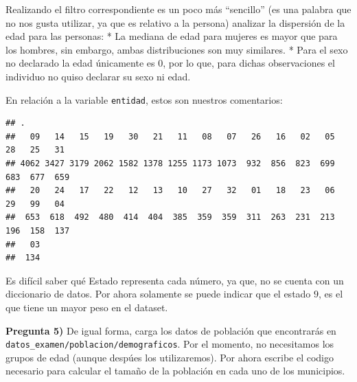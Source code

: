 \documentclass[
]{article}
\newenvironment{Shaded}{\begin{snugshade}}{\end{snugshade}}
\newcommand{\DataTypeTok}[1]{\textcolor[rgb]{0.13,0.29,0.53}{#1}}
\newcommand{\KeywordTok}[1]{\textcolor[rgb]{0.13,0.29,0.53}{\textbf{#1}}}
\newcommand{\NormalTok}[1]{#1}
\newcommand{\OperatorTok}[1]{\textcolor[rgb]{0.81,0.36,0.00}{\textbf{#1}}}
\newcommand{\OtherTok}[1]{\textcolor[rgb]{0.56,0.35,0.01}{#1}}
\newcommand{\StringTok}[1]{\textcolor[rgb]{0.31,0.60,0.02}{#1}}
\begin{document}
Realizando el filtro correspondiente es un poco más ``sencillo'' (es una
palabra que no nos gusta utilizar, ya que es relativo a la persona)
analizar la dispersión de la edad para las personas: * La mediana de
edad para mujeres es mayor que para los hombres, sin embargo, ambas
distribuciones son muy similares. * Para el sexo no declarado la edad
únicamente es 0, por lo que, para dichas observaciones el individuo no
quiso declarar su sexo ni edad.

En relación a la variable \texttt{entidad}, estos son nuestros
comentarios:

\begin{Shaded}
\end{Shaded}

\begin{verbatim}
## .
##   09   14   15   19   30   21   11   08   07   26   16   02   05   28   25   31 
## 4062 3427 3179 2062 1582 1378 1255 1173 1073  932  856  823  699  683  677  659 
##   20   24   17   22   12   13   10   27   32   01   18   23   06   29   99   04 
##  653  618  492  480  414  404  385  359  359  311  263  231  213  196  158  137 
##   03 
##  134
\end{verbatim}

Es difícil saber qué Estado representa cada número, ya que, no se cuenta
con un diccionario de datos. Por ahora solamente se puede indicar que el
estado \(9\), es el que tiene un mayor peso en el dataset.

\textbf{Pregunta 5)} De igual forma, carga los datos de población que
encontrarás en \texttt{datos\_examen/poblacion/demograficos}. Por el
momento, no necesitamos los grupos de edad (aunque despúes los
utilizaremos). Por ahora escribe el codigo necesario para calcular el
tamaño de la población en cada uno de los municipios.

\begin{Shaded}
\end{Shaded}
\end{document}
